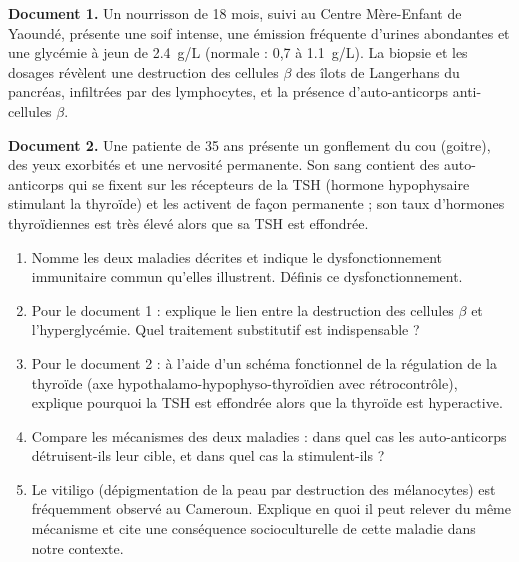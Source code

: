 \documentclass[11pt]{article}
\begin{document}
\begin{exercice}
\textbf{Document 1.} Un nourrisson de 18 mois, suivi au Centre Mère-Enfant de Yaoundé, présente une soif intense, une émission fréquente d'urines abondantes et une glycémie à jeun de \SI{2,4}{g/L} (normale : 0,7 à \SI{1,1}{g/L}). La biopsie et les dosages révèlent une destruction des cellules $\beta$ des îlots de Langerhans du pancréas, infiltrées par des lymphocytes, et la présence d'auto-anticorps anti-cellules $\beta$.

\textbf{Document 2.} Une patiente de 35 ans présente un gonflement du cou (goitre), des yeux exorbités et une nervosité permanente. Son sang contient des auto-anticorps qui se fixent sur les récepteurs de la TSH (hormone hypophysaire stimulant la thyroïde) et les activent de façon permanente ; son taux d'hormones thyroïdiennes est très élevé alors que sa TSH est effondrée.
\begin{enumerate}
\item Nomme les deux maladies décrites et indique le dysfonctionnement immunitaire commun qu'elles illustrent. Définis ce dysfonctionnement.
\item Pour le document 1 : explique le lien entre la destruction des cellules $\beta$ et l'hyperglycémie. Quel traitement substitutif est indispensable ?
\item Pour le document 2 : à l'aide d'un schéma fonctionnel de la régulation de la thyroïde (axe hypothalamo-hypophyso-thyroïdien avec rétrocontrôle), explique pourquoi la TSH est effondrée alors que la thyroïde est hyperactive.
\item Compare les mécanismes des deux maladies : dans quel cas les auto-anticorps détruisent-ils leur cible, et dans quel cas la stimulent-ils ?
\item Le vitiligo (dépigmentation de la peau par destruction des mélanocytes) est fréquemment observé au Cameroun. Explique en quoi il peut relever du même mécanisme et cite une conséquence socioculturelle de cette maladie dans notre contexte.
\end{enumerate}
\end{exercice}
\end{document}
